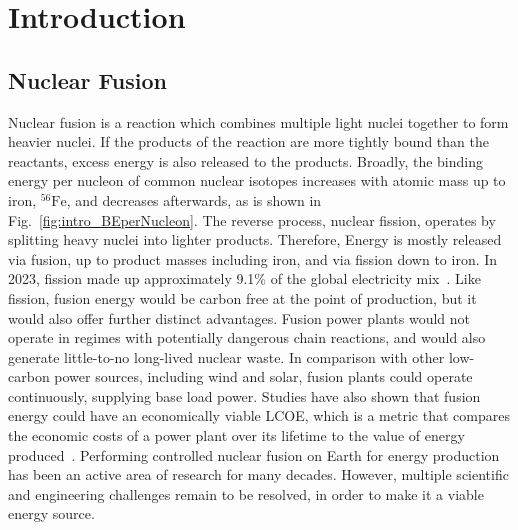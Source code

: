 \chapter{Introduction}%
\label{chap:intro}


\section{Nuclear Fusion}%
\label{sec:intro_whatisfusion}

Nuclear fusion is a reaction which combines multiple light nuclei together to form heavier nuclei.
If the products of the reaction are more tightly bound than the reactants, excess energy is also released to the products.
Broadly, the binding energy per nucleon of common nuclear isotopes increases with atomic mass up to iron, ${}^{56}\text{Fe}$, and decreases afterwards, as is shown in Fig.~\ref{fig:intro_BEperNucleon}.
The reverse process, nuclear fission, operates by splitting heavy nuclei into lighter products.
Therefore, Energy is mostly released via fusion, up to product masses including iron, and via fission down to iron.
In 2023, fission made up approximately 9.1\% of the global electricity mix~\cite{emberinstitute_statistical_2024}.
Like fission, fusion energy would be carbon free at the point of production, but it would also offer further distinct advantages.
Fusion power plants would not operate in regimes with potentially dangerous chain reactions, and would also generate little-to-no long-lived nuclear waste.
In comparison with other low-carbon power sources, including wind and solar, fusion plants could operate continuously, supplying base load power.
Studies have also shown that fusion energy could have an economically viable \ac{LCOE}, which is a metric that compares the economic costs of a power plant over its lifetime to the value of energy produced~\cite{griffiths_commercialisation_2022}.
Performing controlled nuclear fusion on Earth for energy production has been an active area of research for many decades.
However, multiple scientific and engineering challenges remain to be resolved, in order to make it a viable energy source.

